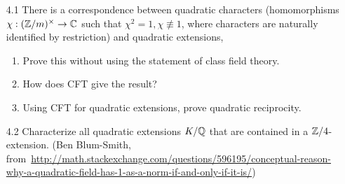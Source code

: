 \begin{enumerate}
\begin{enumerate}
\end{enumerate}
\item[4.1] There is a correspondence between quadratic characters (homomorphisms $\chi:(\mathbb{Z}/m)^{\times}\to \mathbb{C}$ such that $\chi^2=1, \chi\nequiv 1$, where characters are naturally identified by restriction) and quadratic extensions,
\begin{enumerate}
\item
Prove this without using the statement of class field theory.
\item
How does CFT give the result?
\item 
Using CFT for quadratic extensions, prove quadratic reciprocity.
\end{enumerate}
\item[4.2] 
Characterize all quadratic extensions $K/\mathbb{Q}$ that are contained in a $\mathbb{Z}/4$-extension. 
(Ben Blum-Smith, from~\url{http://math.stackexchange.com/questions/596195/conceptual-reason-why-a-quadratic-field-has-1-as-a-norm-if-and-only-if-it-is/})
\end{enumerate}
